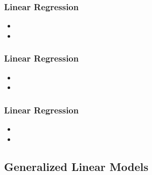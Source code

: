 \documentclass[
    utf8,
    aspectratio=169
]{beamer}  %
\begin{document}
\begin{frame}
\frametitle{Linear Regression}
\begin{itemize}
	\item 
	\item
\end{itemize}
\end{frame}

\begin{frame}
\frametitle{Linear Regression}
\begin{itemize}
	\item 
	\item
\end{itemize}
\end{frame}

\begin{frame}
\frametitle{Linear Regression}
\begin{itemize}
	\item 
	\item
\end{itemize}
\end{frame}

\subsection{Generalized Linear Models}
\end{document}
